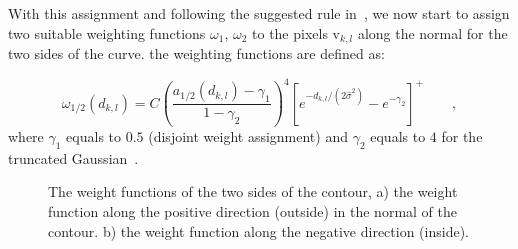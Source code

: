 With this assignment and following the suggested rule in~\cite{hanek2004contracting}, we now start to assign two suitable weighting functions
$\omega_1$, $\omega_2$ to the pixels $\mathrm{v}_{k,l}$ along the
normal for the two sides of the curve. the weighting functions are
defined as:

\begin{equation}
  \label{eq:weight}
  \omega_{1/2}(d_{k,l}) = C\left(\frac{a_{1/2}(d_{k,l}) -
    \gamma_1}{1-\gamma_2}\right)^4 \left[e^{-d_{k,l}/(2\hat{\sigma}^2)} - e^{-\gamma_2}\right]^+\qquad,
\end{equation}
where $\gamma_1$ equals to $0.5$ (disjoint weight assignment) and $\gamma_2$
equals to $4$ for the truncated Gaussian~\cite{hanek2004contracting}. 

\begin{figure} 
  \begin{minipage}[t]{0.5\linewidth} 
    \centering 
  \end{minipage}%
  \begin{minipage}[t]{0.5\linewidth} 
    \centering 
  \end{minipage} 
\caption[Weight functions]{The weight functions of the two sides of the contour, a) the
  weight function along the positive direction (outside) in the normal of the
  contour. b) the weight function along the negative direction (inside). }
\label{fig:weight}
\end{figure}


